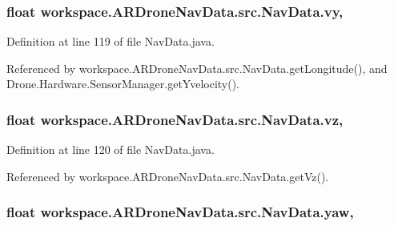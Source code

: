 \subsubsection[{vy}]{\setlength{\rightskip}{0pt plus 5cm}float workspace.\+A\+R\+Drone\+Nav\+Data.\+src.\+Nav\+Data.\+vy\hspace{0.3cm}{\ttfamily [static]}, {\ttfamily [protected]}}\label{classworkspace_1_1_a_r_drone_nav_data_1_1src_1_1_nav_data_a301c734d4cd2475f7a9470074372a6c9}


Definition at line 119 of file Nav\+Data.\+java.



Referenced by workspace.\+A\+R\+Drone\+Nav\+Data.\+src.\+Nav\+Data.\+get\+Longitude(), and Drone.\+Hardware.\+Sensor\+Manager.\+get\+Yvelocity().

\hypertarget{classworkspace_1_1_a_r_drone_nav_data_1_1src_1_1_nav_data_a4624d0a93818c81b849a74147cb747cc}{}
\subsubsection[{vz}]{\setlength{\rightskip}{0pt plus 5cm}float workspace.\+A\+R\+Drone\+Nav\+Data.\+src.\+Nav\+Data.\+vz\hspace{0.3cm}{\ttfamily [static]}, {\ttfamily [protected]}}\label{classworkspace_1_1_a_r_drone_nav_data_1_1src_1_1_nav_data_a4624d0a93818c81b849a74147cb747cc}


Definition at line 120 of file Nav\+Data.\+java.



Referenced by workspace.\+A\+R\+Drone\+Nav\+Data.\+src.\+Nav\+Data.\+get\+Vz().

\hypertarget{classworkspace_1_1_a_r_drone_nav_data_1_1src_1_1_nav_data_a59927db835b55d0812e210d40f6469db}{}
\subsubsection[{yaw}]{\setlength{\rightskip}{0pt plus 5cm}float workspace.\+A\+R\+Drone\+Nav\+Data.\+src.\+Nav\+Data.\+yaw\hspace{0.3cm}{\ttfamily [static]}, {\ttfamily [protected]}}\label{classworkspace_1_1_a_r_drone_nav_data_1_1src_1_1_nav_data_a59927db835b55d0812e210d40f6469db}



